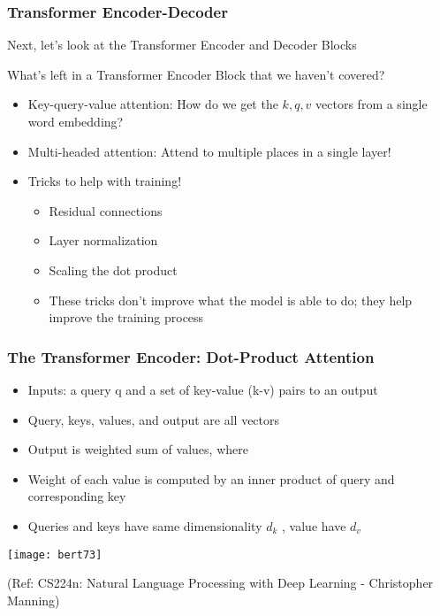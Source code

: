 \begin{frame}[fragile]\frametitle{Transformer Encoder-Decoder}
Next, let’s look at the Transformer Encoder and Decoder Blocks

What’s left in a Transformer Encoder Block that we haven’t covered?

      \begin{itemize}
			\item Key-query-value attention: How do we get the $k,q,v$ vectors from a single word embedding?
			\item Multi-headed attention: Attend to multiple places in a single layer!
			\item Tricks to help with training!
			    \begin{itemize}
					\item Residual connections
					\item Layer normalization
					\item Scaling the dot product
					\item These tricks don’t improve what the model is able to do; they help improve the training process
					\end{itemize}

			\end{itemize}
			
\end{frame}

\begin{frame}[fragile]\frametitle{The Transformer Encoder: Dot-Product Attention}


      \begin{itemize}
			\item Inputs: a query q and a set of key-value (k-v) pairs to an output
			\item Query, keys, values, and output are all vectors
			\item Output is weighted sum of values, where
			\item Weight of each value is computed by an inner product of query and corresponding key
			\item Queries and keys have same dimensionality $d_k$ , value have $d_v$
			\end{itemize}
			
			\begin{center}
			\texttt{[image: bert73]}
			\end{center}		
			
			{\tiny (Ref: CS224n: Natural Language Processing with Deep Learning - Christopher Manning)}

\end{frame}


